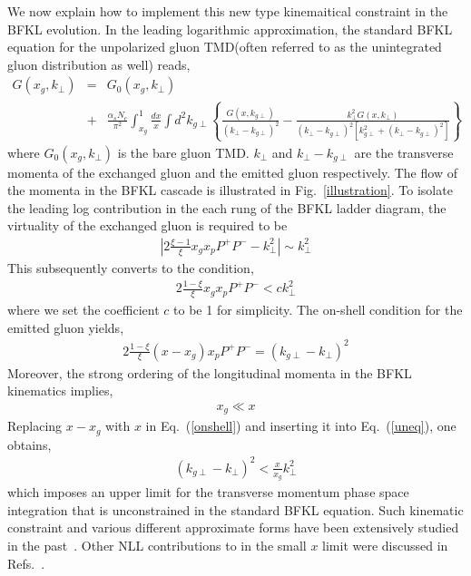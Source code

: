 \documentclass[prd,aps,preprint,tightenlines,nofootinbib,superscriptaddress]{revtex4}
\begin{document}
We now explain how to  implement  this new type kinemaitical constraint in the BFKL evolution.  In the leading logarithmic approximation, the standard BFKL equation for the unpolarized gluon TMD(often referred to as the unintegrated gluon distribution as well) reads,
\begin{eqnarray}
  G(x_g,k_{\perp}) \!\!&=&\!\! G_0(x_g,k_{\perp})
   \\ &+&\!\! \frac{ \alpha_s N_c}{\pi^2}  \!\! \int_{x_g}^{1}\! \frac{d x}{x} \int \!\! d^2 k_{g\perp}   \! \left \{  \frac{ G(x,k_{g\perp})}{(k_\perp-k_{g\perp})^2} 
 -  \frac{k_\perp^2 G(x,k_{\perp})}{(k_\perp-k_{g\perp})^2 \left [k_{g\perp}^2+(k_\perp-k_{g\perp})^2\right ]  
 }   \right \} \nonumber
 \label{sBFKL}
 \end{eqnarray}
 where $G_0(x_g,k_{\perp})$ is the bare gluon TMD. $k_\perp$ and $k_\perp-k_{g\perp}$ are the transverse momenta of the exchanged gluon and the emitted gluon respectively.    The flow of the momenta in the BFKL cascade is illustrated in Fig.~\ref{illustration}.  To isolate the leading log contribution in the each rung of the BFKL ladder diagram, the virtuality of the exchanged gluon is required to be  
\begin{eqnarray} 
| 2\frac{\xi-1}{\xi}x_g x_p P^+ P^- -k_\perp^2| \sim k_\perp^2
\end{eqnarray}
 This subsequently converts  to the condition,
 \begin{eqnarray}
 2 \frac{1-\xi}{\xi}x_g x_p P^+ P^- < c k_\perp^2 
 \label{uneq}
\end{eqnarray}
where we set the coefficient $c$ to be 1 for simplicity.
 The on-shell condition for the emitted gluon yields,
 \begin{eqnarray}
 2 \frac{1-\xi}{\xi}(x-x_g) x_p P^+ P^-=(k_{g\perp}-k_\perp)^2  
 \label{onshell}
\end{eqnarray}
Moreover, the strong ordering of the longitudinal momenta in the BFKL kinematics implies, 
 \begin{eqnarray}
  x_g \ll x
\end{eqnarray}
Replacing $x-x_g$ with $x $ in Eq.~(\ref{onshell}) and inserting it into Eq.~(\ref{uneq}), one obtains,
 \begin{eqnarray}
(k_{g\perp}-k_\perp)^2<\frac{x}{x_g} k_\perp^2
\label{kc}
\end{eqnarray}
which imposes an upper limit for the transverse momentum phase space integration that is unconstrained in the standard BFKL equation.  Such kinematic constraint and various different approximate forms have been extensively studied in the past~\cite{Ciafaloni:1987ur,Catani:1989yc,Andersson:1995ju,Kwiecinski:1996td,Kwiecinski:1997ee}.  Other NLL contributions to  in the small $x$ limit were discussed in Refs.~\cite{Iancu:2015vea,Iancu:2015joa,Lappi:2016fmu,Hatta:2016ujq,Zhou:2016tfe,Xiao:2017yya,Zhou:2018lfq,Zheng:2019zul}.
\end{document}
